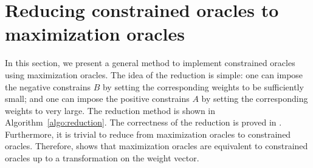 \documentclass{article}
\newcommand{\junk}[1]{}
\newcommand{\M}{\mathcal M}
\newcommand{\B}{\mathcal B}
\DeclareMathOperator{\rank}{width}
\DeclareMathOperator{\Exchange}{Exchange}
\newcommand{\MultiIdent}{\textsc{TopK}\xspace}
\newcommand{\MultiBandit}{\textsc{MB}\xspace}
\newcommand{\Matroid}{\textsc{Matroid}\xspace}
\newcommand{\Match}{\textsc{Match}\xspace}
\newcommand{\Path}{\textsc{Path}\xspace}
\begin{document}
\junk{
\begin{fact} 
Let $\M\subseteq 2^{[n]}$ be one of our example types of decision classes. 
Then we can construct the exchange class for $\M$ and upper bound $\rank(\M)$ as follows.
\begin{itemize}
\item Define $\B_{\Matroid(n)}=\big\{(\{i\},\{j\})\mid\forall i\in [n], j\in [n]\big\}$. If $\M=\M_{\Matroid(T,\sigma)}$, then we have $\B_{\Matroid(n)} \in \Exchange(\M)$ and $\rank(\M) \le 2$.	  
\item Define $\B_{\Match(G,\sigma)}=\big\{(C_+,C_-)\mid \sigma^{-1}(C_+\cup C_-) \text{ is a cycle of }G\big\}$. If $\M=\M_{\Match(G,\sigma)}$, then we have $\B_{\Match(G)} \in \Exchange(\M)$ and $\rank(\M) \le |V|$.	  
\item Define 
$\B_{\Path(G,\sigma)}=\big\{ (P_1, P_2)\mid\sigma^{-1}(P_1)\text{ and }\sigma^{-1}(P_2)\text{ are two disjoint paths of }G\text{ with same endpoints}\big\}$. 
If $\M=\M_{\Path(G,s,t,\sigma)}$, then we have $\B_{\Path(G,\sigma)} \in \Exchange(\M)$ and $\rank(\M) \le |V|$.	  
\end{itemize}
Moreover, since \Matroid encompasses both \MultiIdent and \MultiBandit types of decision classes, we see that $\rank(\M) \le 2$ for decision classes $\M$ of these types.
\label{lemma:example-exchange-class}
\end{fact}
}



\section{Reducing constrained oracles to maximization oracles}

In this section, we present a general method to implement constrained oracles using maximization oracles.
The idea of the reduction is simple: one can impose the negative constrains $B$ by setting the corresponding weights to be sufficiently small; and one can impose the positive constrains $A$ by setting the corresponding weights to very large.
The reduction method is shown in Algorithm~\ref{algo:reduction}.
The correctness of the reduction is proved in .
Furthermore, it is trivial to reduce from maximization oracles to constrained oracles. 
Therefore,  shows that maximization oracles are equivalent to constrained oracles up to a transformation on the weight vector. 
\end{document}
